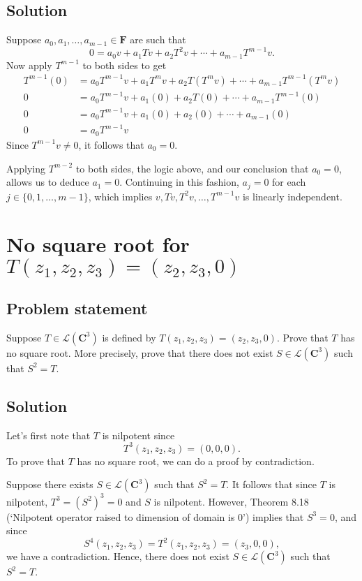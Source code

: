 \documentclass{article}
\begin{document}
\subsection*{Solution}
Suppose $a_0,a_1,\ldots,a_{m-1}\in\mathbf{F}$ are such that 
\[0=a_0v+a_1Tv+a_2T^2v+\cdots+a_{m-1}T^{m-1}v.\]
Now apply $T^{m-1}$ to both sides to get
\begin{align*}
    T^{m-1}(0)&=a_0T^{m-1}v+a_1T^mv+a_2T(T^mv)+\cdots+a_{m-1}T^{m-1}(T^mv)\\
    0&=a_0T^{m-1}v+a_1(0)+a_2T(0)+\cdots+a_{m-1}T^{m-1}(0)\\
    0&=a_0T^{m-1}v+a_1(0)+a_2(0)+\cdots+a_{m-1}(0)\\
    0&=a_0T^{m-1}v
\end{align*}
Since $T^{m-1}v\neq 0$, it follows that $a_0=0$.

Applying $T^{m-2}$ to both sides, the logic above, and our conclusion that $a_0=0$, allows us to deduce $a_1=0$. Continuing in this fashion, $a_j=0$ for each $j\in\{0,1,\ldots,m-1\}$, which implies $v,Tv,T^2v,\ldots,T^{m-1}v$ is linearly independent.

\clearpage

\section{No square root for $T(z_1,z_2,z_3)=(z_2,z_3,0)$}
\subsection*{Problem statement}
Suppose $T\in\mathcal{L}(\mathbf{C}^3)$ is defined by $T(z_1,z_2,z_3)=(z_2,z_3,0)$. Prove that $T$ has no square root. More precisely, prove that there does not exist $S\in\mathcal{L}(\mathbf{C}^3)$ such that $S^2=T$.

\subsection*{Solution}
Let's first note that $T$ is nilpotent since 
\[T^3(z_1,z_2,z_3)=(0,0,0).\]
To prove that $T$ has no square root, we can do a proof by contradiction.

Suppose there exists $S\in\mathcal{L}(\mathbf{C}^3)$ such that $S^2=T$. It follows that since $T$ is nilpotent, $T^3=(S^2)^3=0$ and $S$ is nilpotent. However, Theorem 8.18 (`Nilpotent operator raised to dimension of domain is 0') implies that $S^3=0$, and since 
\[S^4(z_1,z_2,z_3)=T^2(z_1,z_2,z_3)=(z_3,0,0),\] 
we have a contradiction. Hence, there does not exist $S\in\mathcal{L}(\mathbf{C}^3)$ such that $S^2=T$.
\end{document}
